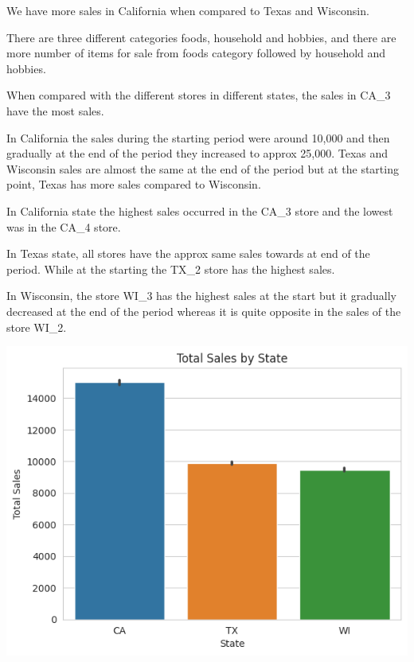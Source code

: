 \documentclass[fleqn,10pt]{SelfArx} %
\begin{document}
\item We have more sales in California when compared to Texas and Wisconsin.
\item There are three different categories foods, household and hobbies, and there are more number of items for sale from foods category followed by household and hobbies.
\item When compared with the different stores in different states, the sales in CA\_3 have the most sales.
\item In California the sales during the starting period were around 10,000 and then gradually at the end of the period they increased to approx 25,000. Texas and Wisconsin sales are almost the same at the end of the period but at the starting point, Texas has more sales compared to Wisconsin.
\item In California state the highest sales occurred in the CA\_3 store and the lowest was in the CA\_4 store.
\item In Texas state, all stores have the approx same sales towards at end of the period. While at the starting the TX\_2 store has the highest sales.
\item In Wisconsin, the store WI\_3 has the highest sales at the start but it gradually decreased at the end of the period whereas it is quite opposite in the sales of the store WI\_2.

\includegraphics[scale=0.5]{31.png}
\end{document}
